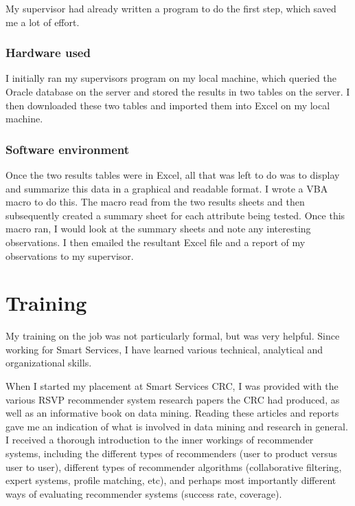 \documentclass{report}
\begin{document}
My supervisor had already written a program to do the first step, which saved me a lot of effort.

\subsection{Hardware used}
I initially ran my supervisors program on my local machine, which queried the Oracle database on the server and stored the results in two tables on the server. I then downloaded these two tables and imported them into Excel on my local machine.

\subsection{Software environment}
Once the two results tables were in Excel, all that was left to do was to display and summarize this data in a graphical and readable format. I wrote a VBA macro to do this. The macro read from the two results sheets and then subsequently created a summary sheet for each attribute being tested. Once this macro ran, I would look at the summary sheets and note any interesting observations. I then emailed the resultant Excel file and a report of my observations to my supervisor.


\chapter{Training}
My training on the job was not particularly formal, but was very helpful. Since working for Smart Services, I have learned various technical, analytical and organizational skills.

When I started my placement at Smart Services CRC, I was provided with the various RSVP recommender system research papers the CRC had produced, as well as an informative book on data mining. Reading these articles and reports gave me an indication of what is involved in data mining and research in general. I received a thorough introduction to the inner workings of recommender systems, including the different types of recommenders (user to product versus user to user), different types of recommender algorithms (collaborative filtering, expert systems, profile matching, etc), and perhaps most importantly different ways of evaluating recommender systems (success rate, coverage).
\end{document}
